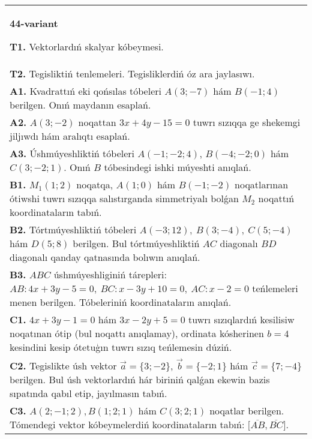 \documentclass{article}
\begin{document}
\begin{tabular}{m{17cm}}
\textbf{44-variant}

\textbf{T1.} 
Vektorlardıń skalyar kóbeymesi.
 \\
\textbf{T2.} 
Tegisliktiń tenlemeleri. Tegisliklerdiń óz ara jaylasıwı.
 \\
\textbf{A1.} 
Kvadrattıń eki qońsılas tóbeleri $A (3; -7) $ hám
$B (-1;4) $ berilgen. Onıń maydanın esaplań.
 \\
\textbf{A2.} 
$A (3;-2) $ noqattan $3x+4y-15=0$ tuwrı sızıqqa
ge shekemgi jiljıwdı hám aralıqtı esaplań.
 \\
\textbf{A3.} 
Úshmúyeshliktiń tóbeleri
$A (- 1; - 2;4) $, $B (- 4; - 2;0) $ hám $C (3; -2;1) $. Onıń $B$ tóbesindegi
ishki múyeshti anıqlań.
 \\
\textbf{B1.} 
\(M_{1} (1;2) \) noqatqa, \(A (1;0) \) hám \(B (-1;-2) \)
noqatlarınan ótiwshi tuwrı sızıqqa salıstırganda simmetriyalı bolǵan \(M_{2}\) noqattıń koordinataların tabıń.
 \\
\textbf{B2.} 
Tórtmúyeshliktiń tóbeleri
\(A (-3;12),\ B (3;-4),\ C (5;-4) \) hám \(D (5;8) \) berilgen. Bul
tórtmúyeshliktiń $AC$ diagonalı $BD$ diagonalı qanday
qatnasında bolıwın anıqlań.
 \\
\textbf{B3.} 
$ABC$ úshmúyeshliginiń tárepleri:
\(AB:4x+3y-5=0,\ BC:x-3y+10=0,\ AC:x-2=0\)
teńlemeleri menen berilgen. Tóbeleriniń koordinataların anıqlań.
 \\
\textbf{C1.} 
\(4x+3y-1=0\) hám \(3x-2y+5=0\)
tuwrı sızıqlardıń kesilisiw noqatınan ótip (bul noqattı anıqlamay), ordinata
kósherinen \(b=4\) kesindini kesip ótetuģın tuwrı sızıq teńlemesin dúziń.
 \\
\textbf{C2.} 
Tegislikte úsh vektor $\vec{a} = \{ 3; - 2\}$, $\vec{b} = \{ - 2;1\}$ hám $\vec{c} = \{ 7; - 4\}$ berilgen. Bul úsh vektorlardıń hár biriniń qalǵan ekewin bazis sıpatında qabıl etip, jayılmasın tabıń.
 \\
\textbf{C3.} 
$A (2; -1;2), B (1;2; 1) $ hám $C (3;2;1) $ noqatlar berilgen. Tómendegi vektor kóbeymelerdiń koordinataların tabıń:
$\lbrack\overline{AB},\overline{BC}\rbrack$.
 \\

\end{tabular}
\vspace{1cm}
\end{document}
